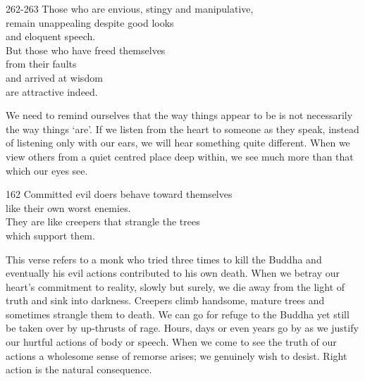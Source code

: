 
\begin{dhpVerse}{262-263}
\label{dhp-262}\label{dhp-263}
Those who are envious, stingy and manipulative,\\
remain unappealing despite good looks\\
and eloquent speech.\\
But those who have freed themselves\\
from their faults\\
and arrived at wisdom\\
are attractive indeed.
\end{dhpVerse}

\begin{dhpRefl}

We need to remind ourselves that the way things appear to be is not
necessarily the way things `are'. If we listen from the heart to
someone as they speak, instead of listening only with our ears, we
will hear something quite different. When we view others from a quiet
centred place deep within, we see much more than that which our eyes
see.

\end{dhpRefl}


\begin{dhpVerse}{162}
\label{dhp-162}
Committed evil doers behave toward themselves\\
like their own worst enemies.\\
They are like creepers that strangle the trees\\
which support them.
\end{dhpVerse}

\begin{dhpRefl}

This verse refers to a monk who tried three times to kill the Buddha
and eventually his evil actions contributed to his own death. When we
betray our heart's commitment to reality, slowly but surely, we die
away from the light of truth and sink into darkness. Creepers climb
handsome, mature trees and sometimes strangle them to death. We can
go for refuge to the Buddha yet still be taken over by up-thrusts of
rage. Hours, days or even years go by as we justify our hurtful
actions of body or speech. When we come to see the truth of our
actions a wholesome sense of remorse arises; we genuinely wish to
desist. Right action is the natural consequence.

\end{dhpRefl}


